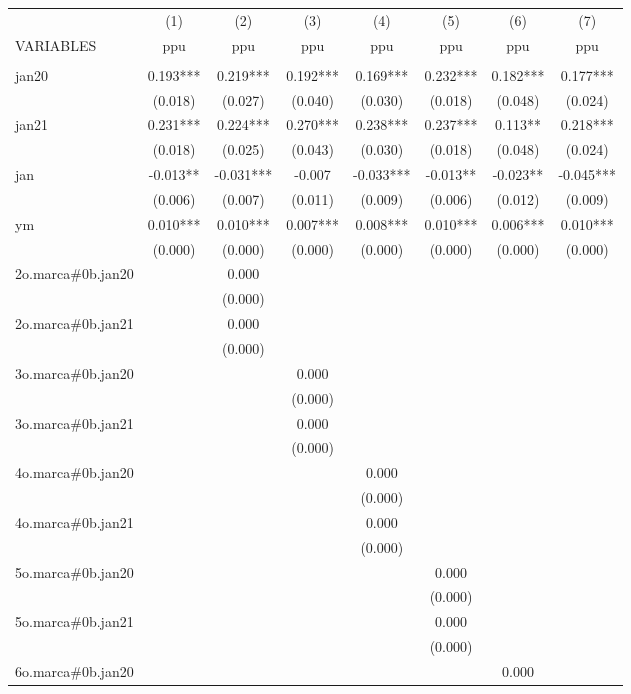 \begin{tabular}{lccccccc} \hline
 & (1) & (2) & (3) & (4) & (5) & (6) & (7) \\
VARIABLES & ppu & ppu & ppu & ppu & ppu & ppu & ppu \\ \hline
 &  &  &  &  &  &  &  \\
jan20 & 0.193*** & 0.219*** & 0.192*** & 0.169*** & 0.232*** & 0.182*** & 0.177*** \\
 & (0.018) & (0.027) & (0.040) & (0.030) & (0.018) & (0.048) & (0.024) \\
jan21 & 0.231*** & 0.224*** & 0.270*** & 0.238*** & 0.237*** & 0.113** & 0.218*** \\
 & (0.018) & (0.025) & (0.043) & (0.030) & (0.018) & (0.048) & (0.024) \\
jan & -0.013** & -0.031*** & -0.007 & -0.033*** & -0.013** & -0.023** & -0.045*** \\
 & (0.006) & (0.007) & (0.011) & (0.009) & (0.006) & (0.012) & (0.009) \\
ym & 0.010*** & 0.010*** & 0.007*** & 0.008*** & 0.010*** & 0.006*** & 0.010*** \\
 & (0.000) & (0.000) & (0.000) & (0.000) & (0.000) & (0.000) & (0.000) \\
2o.marca\#0b.jan20 &  & 0.000 &  &  &  &  &  \\
 &  & (0.000) &  &  &  &  &  \\
2o.marca\#0b.jan21 &  & 0.000 &  &  &  &  &  \\
 &  & (0.000) &  &  &  &  &  \\
3o.marca\#0b.jan20 &  &  & 0.000 &  &  &  &  \\
 &  &  & (0.000) &  &  &  &  \\
3o.marca\#0b.jan21 &  &  & 0.000 &  &  &  &  \\
 &  &  & (0.000) &  &  &  &  \\
4o.marca\#0b.jan20 &  &  &  & 0.000 &  &  &  \\
 &  &  &  & (0.000) &  &  &  \\
4o.marca\#0b.jan21 &  &  &  & 0.000 &  &  &  \\
 &  &  &  & (0.000) &  &  &  \\
5o.marca\#0b.jan20 &  &  &  &  & 0.000 &  &  \\
 &  &  &  &  & (0.000) &  &  \\
5o.marca\#0b.jan21 &  &  &  &  & 0.000 &  &  \\
 &  &  &  &  & (0.000) &  &  \\
6o.marca\#0b.jan20 &  &  &  &  &  & 0.000 &  \\

\end{tabular}
